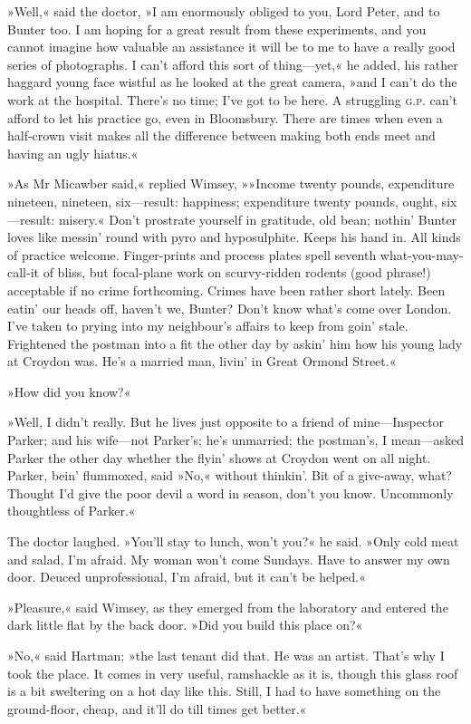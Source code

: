 »Well,« said the doctor, »I am enormously obliged to you, Lord Peter, and to Bunter too. I am hoping for a great result from these experiments, and you cannot imagine how valuable an assistance it will be to me to have a really good series of photographs. I can't afford this sort of thing—yet,« he added, his rather haggard young face wistful as he looked at the great camera, »and I can't do the work at the hospital. There's no time; I've got to be here. A struggling \textsc{g.p.} can't afford to let his practice go, even in Bloomsbury. There are times when even a half-crown visit makes all the difference between making both ends meet and having an ugly hiatus.«

»As Mr Micawber said,« replied Wimsey, »»Income twenty pounds, expenditure nineteen, nineteen, six—result: happiness; expenditure twenty pounds, ought, six—result: misery.« Don't prostrate yourself in gratitude, old bean; nothin' Bunter loves like messin' round with pyro and hyposulphite. Keeps his hand in. All kinds of practice welcome. Finger-prints and process plates spell seventh what-you-may-call-it of bliss, but focal-plane work on scurvy-ridden rodents (good phrase!) acceptable if no crime forthcoming. Crimes have been rather short lately. Been eatin' our heads off, haven't we, Bunter? Don't know what's come over London. I've taken to prying into my neighbour's affairs to keep from goin' stale. Frightened the postman into a fit the other day by askin' him how his young lady at Croydon was. He's a married man, livin' in Great Ormond Street.«

»How did you know?«

»Well, I didn't really. But he lives just opposite to a friend of mine—Inspector Parker; and his wife—not Parker's; he's unmarried; the postman's, I mean—asked Parker the other day whether the flyin' shows at Croydon went on all night. Parker, bein' flummoxed, said »No,« without thinkin'. Bit of a give-away, what? Thought I'd give the poor devil a word in season, don't you know. Uncommonly thoughtless of Parker.«

The doctor laughed. »You'll stay to lunch, won't you?« he said. »Only cold meat and salad, I'm afraid. My woman won't come Sundays. Have to answer my own door. Deuced unprofessional, I'm afraid, but it can't be helped.«

»Pleasure,« said Wimsey, as they emerged from the laboratory and entered the dark little flat by the back door. »Did you build this place on?«

»No,« said Hartman; »the last tenant did that. He was an artist. That's why I took the place. It comes in very useful, ramshackle as it is, though this glass roof is a bit sweltering on a hot day like this. Still, I had to have something on the ground-floor, cheap, and it'll do till times get better.«


